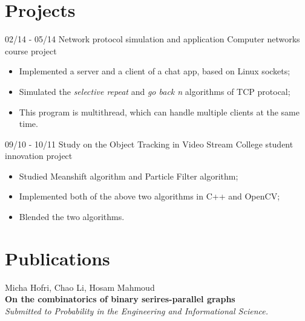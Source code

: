 \documentclass[]{friggeri-cv}
\begin{document}
\section{Projects}
\begin{entrylist}
	\entry
	{02/14 - 05/14}
	{Network protocol simulation and application}
	{Computer networks course project}
	{
		\vspace{-3mm}
		\begin{itemize}
			\item Implemented a server and a client of a chat app, based on Linux
				sockets;
			\item Simulated the \emph{selective repeat} and \emph{go back n}
				algorithms of TCP protocal;
			\item This program is multithread, which can handle multiple clients at
				the same time.
		\end{itemize}
	}
	\entry
	{09/10 - 10/11}
	{Study on the Object Tracking in Video Stream}
	{College student innovation project}
	{
		\vspace{-3mm}
		\begin{itemize}
			\item Studied Meanshift algorithm and Particle Filter algorithm;
			\item Implemented both of the above two algorithms in C++ and OpenCV;
			\item Blended the two algorithms.
		\end{itemize}
	}
\end{entrylist}
\section{Publications}
Micha Hofri, Chao Li, Hosam Mahmoud\\
\textbf{On the combinatorics of binary serires-parallel graphs}\\
\emph{Submitted to Probability in the Engineering and Informational Science.}
\end{document}

